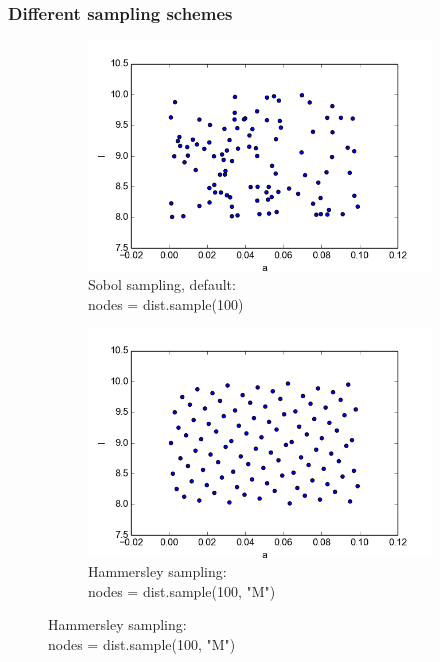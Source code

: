 \documentclass{beamer}
\begin{document}
  \begin{frame}
 \frametitle{Different sampling schemes}
 \begin{figure}        
 \begin{subfigure}[b]{0.5\textwidth}
                \includegraphics[width=\textwidth]{samples.png}
                \caption{Sobol sampling, default: \\                
                nodes = dist.sample(100)}
        \end{subfigure}%
 \begin{subfigure}[b]{0.5\textwidth}
                \includegraphics[width=\textwidth]{samples_M.png}
                \caption{Hammersley sampling: \\                
                nodes = dist.sample(100, "M")}
        \end{subfigure}
        \end{figure}
\end{frame}
  
\end{document}
